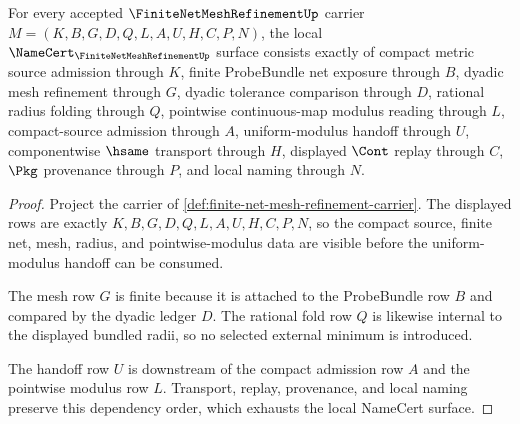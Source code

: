 \begin{theorem}
\label{thm:finite-net-mesh-refinement-namecert-obligations}
For every accepted $\FiniteNetMeshRefinementUp$ carrier $M=(K,B,G,D,Q,L,A,U,H,C,P,N)$, the local $\NameCert_{\FiniteNetMeshRefinementUp}$ surface consists exactly of compact metric source admission through $K$, finite ProbeBundle net exposure through $B$, dyadic mesh refinement through $G$, dyadic tolerance comparison through $D$, rational radius folding through $Q$, pointwise continuous-map modulus reading through $L$, compact-source admission through $A$, uniform-modulus handoff through $U$, componentwise $\hsame$ transport through $H$, displayed $\Cont$ replay through $C$, $\Pkg$ provenance through $P$, and local naming through $N$.
\end{theorem}
\begin{proof}
Project the carrier of \autoref{def:finite-net-mesh-refinement-carrier}. The displayed rows are exactly $K,B,G,D,Q,L,A,U,H,C,P,N$, so the compact source, finite net, mesh, radius, and pointwise-modulus data are visible before the uniform-modulus handoff can be consumed.

The mesh row $G$ is finite because it is attached to the ProbeBundle row $B$ and compared by the dyadic ledger $D$. The rational fold row $Q$ is likewise internal to the displayed bundled radii, so no selected external minimum is introduced.

The handoff row $U$ is downstream of the compact admission row $A$ and the pointwise modulus row $L$. Transport, replay, provenance, and local naming preserve this dependency order, which exhausts the local NameCert surface.
\end{proof}

